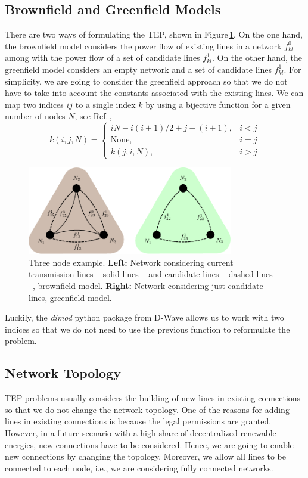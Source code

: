 \subsection{Brownfield and Greenfield Models}
There are two ways of formulating the TEP, shown in Figure\,\ref{fig: ThreeNode}. On the one hand, the brownfield model considers the power flow of existing lines in a network $f_{kl}^{0}$ among with the power flow of a set of candidate lines $f_{kl}^{1}$. On the other hand, the greenfield model considers an empty network and a set of candidate lines $f_{kl}^{1}$. For simplicity, we are going to consider the greenfield approach so that we do not have to take into account the constants associated with the existing lines. We can map two indices $ij$ to a single index $k$ by using a bijective function for a given number of nodes $N$, see Ref.\,\cite{Jain2021SolvingComputer},
\begin{equation}
k(i,j,N) = \begin{cases}
    iN - i\left(i+1\right)/2 + j - (i+1), & i<j\\
    \text{None},& i=j \\
    k(j,i,N), & i>j
\end{cases}
    \label{eq: TwoIndexesmap}
\end{equation}
\begin{figure}[H]
  \begin{center}
\includegraphics[width=0.8\textwidth]{Figures/3NodeBrownGreen.pdf}
  \end{center}
  \caption{Three node example. \textbf{Left:} Network considering current transmission lines -- solid lines -- and candidate lines -- dashed lines --, brownfield model. \textbf{Right:} Network considering just candidate lines, greenfield model.}
  \label{fig: ThreeNode}
\end{figure}
Luckily, the \textit{dimod} python package from D-Wave allows us to work with two indices so that we do not need to use the previous function to reformulate the problem. 
\subsection{Network Topology}
TEP problems usually considers the building of new lines in existing connections so that we do not change the network topology. One of the reasons for adding lines in existing connections is because the legal permissions are granted. However, in a future scenario with a high share of decentralized renewable energies, new connections have to be considered. Hence, we are going to enable new connections by changing the topology. Moreover, we allow all lines to be connected to each node, i.e., we are considering fully connected networks.
